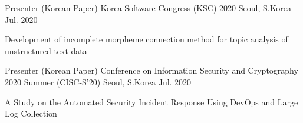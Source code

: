 

\begin{cventries}

\cventry
  {Presenter (Korean Paper)} %
  {Korea Software Congress (KSC) 2020} %
  {Seoul, S.Korea} %
  {Jul. 2020} %
  {
    \begin{cvitems}
      \item {Development of incomplete morpheme connection method for topic analysis of unstructured text data}
    \end{cvitems}
  }

\cventry
  {Presenter (Korean Paper)} %
  {Conference on Information Security and Cryptography 2020 Summer (CISC-S'20)} %
  {Seoul, S.Korea} %
  {Jul. 2020} %
  {
    \begin{cvitems}
      \item {A Study on the Automated Security Incident Response Using DevOps and Large Log Collection}
    \end{cvitems}
  }

\end{cventries}